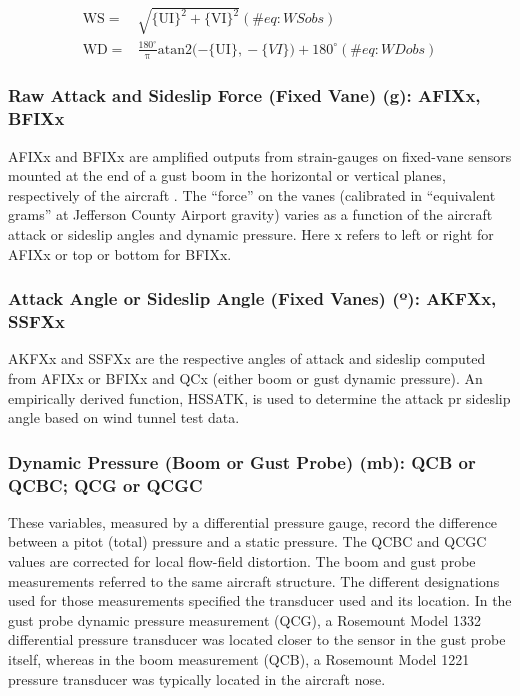 \documentclass[
  english,
]{book}
\begin{document}
\begin{align}
\mathrm{WS} = & \sqrt{\mathrm{\{UI\}^{2}+\{VI\}^{2}}} (\#eq:WSobs)\\
\mathrm{WD} = & \mathrm{\frac{180^{\circ}}{\pi}atan2(-\{UI\},}-\{VI\})+180^{\circ}
(\#eq:WDobs)
\end{align}

\hypertarget{vanes}{%
\subsubsection*{Raw Attack and Sideslip Force (Fixed Vane) (g): AFIXx,
BFIXx}\label{vanes}}

AFIXx and BFIXx are amplified outputs from strain-gauges on fixed-vane
sensors mounted at the end of a gust boom in the horizontal or vertical
planes, respectively of the aircraft . The ``force'' on the vanes
(calibrated in ``equivalent grams'' at Jefferson County Airport gravity)
varies as a function of the aircraft attack or sideslip angles and
dynamic pressure. Here x refers to left or right for AFIXx or top or
bottom for BFIXx.

\hypertarget{akfxx}{%
\subsubsection*{\texorpdfstring{Attack Angle or Sideslip Angle (Fixed
Vanes) ({º}): AKFXx,
SSFXx}{Attack Angle or Sideslip Angle (Fixed Vanes) (º): AKFXx, SSFXx}}\label{akfxx}}

AKFXx and SSFXx are the respective angles of attack and sideslip
computed from AFIXx or BFIXx and QCx (either boom or gust dynamic
pressure). An empirically derived function, HSSATK, is used to determine
the attack pr sideslip angle based on wind tunnel test data.

\hypertarget{qcb}{%
\subsubsection*{Dynamic Pressure (Boom or Gust Probe) (mb): QCB or QCBC;
QCG or QCGC}\label{qcb}}

These variables, measured by a differential pressure gauge, record the
difference between a pitot (total) pressure and a static pressure. The
QCBC and QCGC values are corrected for local flow-field distortion. The
boom and gust probe measurements referred to the same aircraft
structure. The different designations used for those measurements
specified the transducer used and its location. In the gust probe
dynamic pressure measurement (QCG), a Rosemount Model 1332 differential
pressure transducer was located closer to the sensor in the gust probe
itself, whereas in the boom measurement (QCB), a Rosemount Model 1221
pressure transducer was typically located in the aircraft nose.
\end{document}
